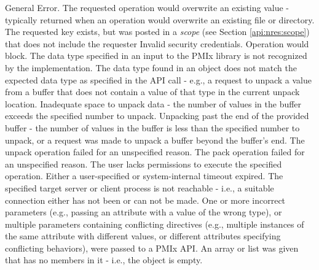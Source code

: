 \begin{constantdesc}
%
General Error.
%
The requested operation would overwrite an existing value - typically returned
when an operation would overwrite an existing file or directory.
%
The requested key exists, but was posted in a \emph{scope} (see Section \ref{api:nres:scope}) that does not include the requester
%
Invalid security credentials.
%
Operation would block.
%
The data type specified in an input to the \ac{PMIx} library is not recognized
by the implementation.
%
The data type found in an object does not match the expected data type
as specified in the \ac{API} call - e.g., a request to unpack a
 value from a buffer that does not contain a value of
that type in the current unpack location.
%
Inadequate space to unpack data - the number of values in the buffer exceeds
the specified number to unpack.
%
Unpacking past the end of the provided buffer - the number of values in the
buffer is less than the specified number to unpack, or a request was made to
unpack a buffer beyond the buffer's end.
%
The unpack operation failed for an unspecified reason.
%
The pack operation failed for an unspecified reason.
%
The user lacks permissions to execute the specified operation.
%
Either a user-specified or system-internal timeout expired.
%
The specified target server or client process is not reachable - i.e., a
suitable connection either has not been or can not be made.
%
One or more incorrect parameters (e.g., passing an attribute with a value of the wrong type), or multiple parameters containing conflicting directives (e.g., multiple instances of the same attribute with different values, or different attributes specifying conflicting behaviors), were passed to a \ac{PMIx} \ac{API}.
%
An array or list was given that has no members in it - i.e., the object is empty.

\end{constantdesc}
